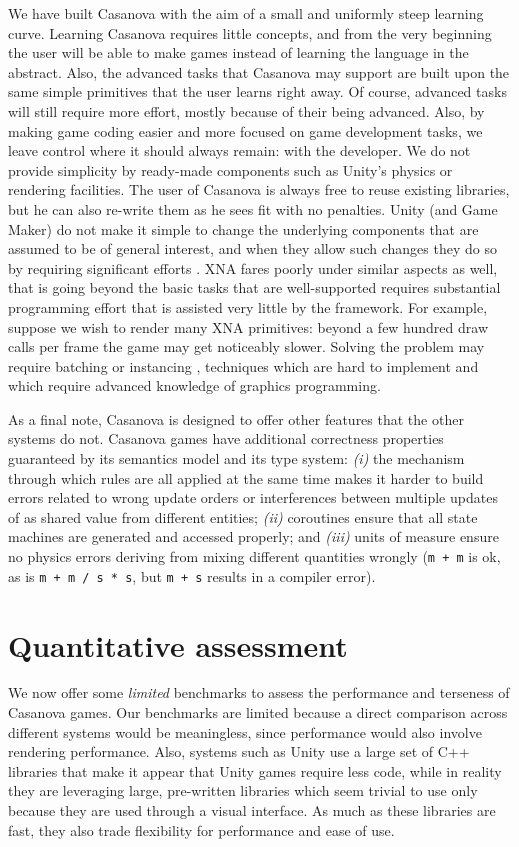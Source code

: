 We have built Casanova with the aim of a small and uniformly steep learning curve. Learning Casanova requires little concepts, and from the very beginning the user will be able to make games instead of learning the language in the abstract. Also, the advanced tasks that Casanova may support are built upon the same simple primitives that the user learns right away. Of course, advanced tasks will still require more effort, mostly because of their being advanced. Also, by making game coding easier and more focused on game development tasks, we leave control where it should always remain: with the developer. We do not provide simplicity by ready-made components such as Unity's physics or rendering facilities. The user of Casanova is always free to reuse existing libraries, but he can also re-write them as he sees fit with no penalties. Unity (and Game Maker) do not make it simple to change the underlying components that are assumed to be of general interest, and when they allow such changes they do so by requiring significant efforts \cite{CHAPTER_8_GMOGRE}. XNA fares poorly under similar aspects as well, that is going beyond the basic tasks that are well-supported requires substantial programming effort that is assisted very little by the framework. For example, suppose we wish to render many XNA primitives: beyond a few hundred draw calls per frame the game may get noticeably slower. Solving the problem may require batching or instancing \cite{GPU_GEMS_2}, techniques which are hard to implement and which require advanced knowledge of graphics programming. 

As a final note, Casanova is designed to offer other features that the other systems do not. Casanova games have additional correctness properties guaranteed by its semantics model and its type system: \textit{(i)} the mechanism through which rules are all applied at the same time makes it harder to build errors related to wrong update orders or interferences between multiple updates of as shared value from different entities; \textit{(ii)} coroutines ensure that all state machines are generated and accessed properly; and \textit{(iii)} units of measure ensure no physics errors deriving from mixing different quantities wrongly (\texttt{m + m} is ok, as is \texttt{m + m / s * s}, but \texttt{m + s} results in a compiler error). 


\section{Quantitative assessment}
We now offer some \textit{limited} benchmarks to assess the performance and terseness of Casanova games. Our benchmarks are limited because a direct comparison across different systems would be meaningless, since performance would also involve rendering performance. Also, systems such as Unity use a large set of C++ libraries that make it appear that Unity games require less code, while in reality they are leveraging large, pre-written libraries which seem trivial to use only because they are used through a visual interface. As much as these libraries are fast, they also trade flexibility for performance and ease of use.

